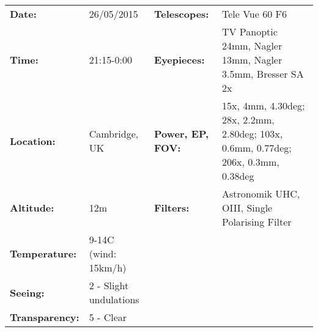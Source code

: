 \begin{tabular}{ p{0.9in} p{1.3in} p{1.2in} p{5.2in}}
{\bf Date:} & 26/05/2015 & {\bf Telescopes:} & Tele Vue 60 F6 \\ 
{\bf Time:} & 21:15-0:00 & {\bf Eyepieces:} & TV Panoptic 24mm, Nagler 13mm, Nagler 3.5mm, Bresser SA 2x \\ 
{\bf Location:} & Cambridge, UK & {\bf Power, EP, FOV:} & 15x, 4mm, 4.30deg; 28x, 2.2mm, 2.80deg; 103x, 0.6mm, 0.77deg; 206x, 0.3mm, 0.38deg \\ 
{\bf Altitude:} & 12m & {\bf Filters:} & Astronomik UHC, OIII, Single Polarising Filter \\ 
{\bf Temperature:} & 9-14C (wind: 15km/h) & & \\ 
{\bf Seeing:} & 2 - Slight undulations & & \\ 
{\bf Transparency:} & 5 - Clear & & \\ 
\end{tabular}
